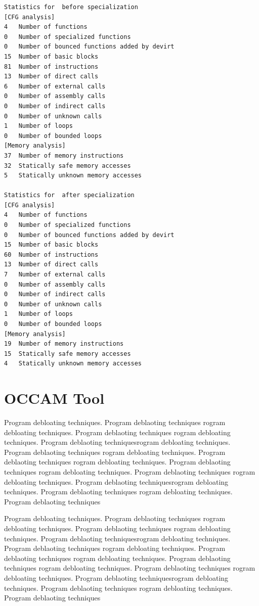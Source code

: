 \documentclass{relatorio}
\begin{document}
\begin{lstlisting}
Statistics for  before specialization
[CFG analysis]
4 	Number of functions
0 	Number of specialized functions
0 	Number of bounced functions added by devirt
15 	Number of basic blocks
81 	Number of instructions
13 	Number of direct calls
6 	Number of external calls
0 	Number of assembly calls
0 	Number of indirect calls
0 	Number of unknown calls
1 	Number of loops   
0 	Number of bounded loops
[Memory analysis]
37 	Number of memory instructions
32 	Statically safe memory accesses
5 	Statically unknown memory accesses

Statistics for  after specialization
[CFG analysis]
4 	Number of functions
0 	Number of specialized functions
0 	Number of bounced functions added by devirt
15	Number of basic blocks
60 	Number of instructions
13 	Number of direct calls
7 	Number of external calls
0 	Number of assembly calls
0 	Number of indirect calls
0 	Number of unknown calls
1 	Number of loops   
0 	Number of bounded loops
[Memory analysis]
19 	Number of memory instructions
15 	Statically safe memory accesses
4 	Statically unknown memory accesses
\end{lstlisting} 

\section{OCCAM Tool}%
\label{Tools}

Program debloating techniques. Program deblaoting techniques rogram debloating techniques. Program deblaoting techniques
rogram debloating techniques. Program deblaoting techniquesrogram debloating techniques. Program deblaoting techniques
rogram debloating techniques. Program deblaoting techniques rogram debloating techniques. Program deblaoting techniques
rogram debloating techniques. Program deblaoting techniques 
rogram debloating techniques. Program deblaoting techniquesrogram debloating techniques. Program deblaoting techniques
rogram debloating techniques. Program deblaoting techniques

Program debloating techniques. Program deblaoting techniques rogram debloating techniques. Program deblaoting techniques
rogram debloating techniques. Program deblaoting techniquesrogram debloating techniques. Program deblaoting techniques
rogram debloating techniques. Program deblaoting techniques rogram debloating techniques. Program deblaoting techniques
rogram debloating techniques. Program deblaoting techniques 
rogram debloating techniques. Program deblaoting techniquesrogram debloating techniques. Program deblaoting techniques
rogram debloating techniques. Program deblaoting techniques
\end{document}
